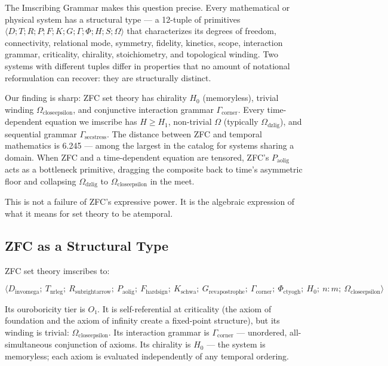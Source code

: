 \documentclass[12pt,a4paper]{article}
\begin{document}
The Imscribing Grammar makes this question precise. Every mathematical or physical system has a structural type --- a 12-tuple of primitives $\langle D; T; R; P; F; K; G; \Gamma; \Phi; H; {S}; \Omega \rangle$ that characterizes its degrees of freedom, connectivity, relational mode, symmetry, fidelity, kinetics, scope, interaction grammar, criticality, chirality, stoichiometry, and topological winding. Two systems with different tuples differ in properties that no amount of notational reformulation can recover: they are structurally distinct.

Our finding is sharp: ZFC set theory has chirality $H_0$ (memoryless), trivial winding $\Omega_{\text{closeepsilon}}$, and conjunctive interaction grammar $\Gamma_{\text{corner}}$. Every time-dependent equation we imscribe has $H \geq H_1$, non-trivial $\Omega$ (typically $\Omega_{\text{dzlig}}$), and sequential grammar $\Gamma_{\text{secstress}}$. The distance between ZFC and temporal mathematics is 6.245 --- among the largest in the catalog for systems sharing a domain. When ZFC and a time-dependent equation are tensored, ZFC's $P_{\text{aolig}}$ acts as a bottleneck primitive, dragging the composite back to time's asymmetric floor and collapsing $\Omega_{\text{dzlig}}$ to $\Omega_{\text{closeepsilon}}$ in the meet.

This is not a failure of ZFC's expressive power. It is the algebraic expression of what it means for set theory to be atemporal.

\subsection{ZFC as a Structural Type}

ZFC set theory imscribes to:

\[\langle D_{\text{invomega}};\ T_{\text{nrleg}};\ R_{\text{subrightarrow}};\ P_{\text{aolig}};\ F_{\text{hardsign}};\ K_{\text{schwa}};\ G_{\text{revapostrophe}};\ \Gamma_{\text{corner}};\ \Phi_{\text{ctyogh}};\ H_0;\ n{:}m;\ \Omega_{\text{closeepsilon}} \rangle\]

Its ouroboricity tier is $O₁$. It is self-referential at criticality (the axiom of foundation and the axiom of infinity create a fixed-point structure), but its winding is trivial: $\Omega_{\text{closeepsilon}}$. Its interaction grammar is $\Gamma_{\text{corner}}$ --- unordered, all-simultaneous conjunction of axioms. Its chirality is $H_0$ --- the system is memoryless; each axiom is evaluated independently of any temporal ordering.
\end{document}
